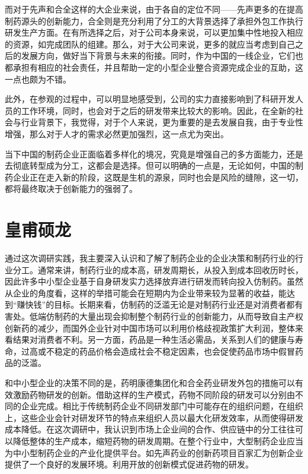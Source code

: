 而对于先声和合全这样的大企业来说，由于各自的定位不同——先声更多的在提高制药源头的创新能力，合全则是充分利用了分工的大背景选择了承担外包工作执行研发生产方面。在有所选择之后，对于公司本身来说，可以更加集中性地投入相应的资源，如完成团队的组建。那么，对于大公司来说，更多的就应当考虑到自己之后的发展方向，做好当下背景与未来的衔接。同时，作为中国的一线企业，它们也都承担有相应的社会责任，并且帮助一定的小型企业整合资源完成企业的互助，这一点也颇为不错。

此外，在参观的过程中，可以明显地感受到，公司的实力直接影响到了科研开发人员的工作环境，同时，也会对于之后的研发带来比较大的影响。因此，在全新的社会与行业背景下，我觉得，对于个人来说，更为重要的是去发展自我，由于专业性增强，那么对于人才的需求必然更加强烈，这一点尤为突出。

当下中国的制药企业正面临着多样化的境况，究竟是增强自己的多方面能力，还是去彻底转型成为分工，这都会是选择。但可以明确的一点是，无论如何，中国的制药企业正在走入新的阶段，这既是生机的源泉，同时也会是风险的缝隙，这一切，都将最终取决于创新能力的强弱了。


\section*{皇甫硕龙}

通过这次调研实践，我主要深入认识和了解了制药企业的企业决策和制药行业的行业分工。通常来讲，制药行业的成本高，研发周期长，从投入到成本回收历时长，因此许多中小型企业基于自身研发实力选择放弃进行研发而转向投入仿制药。虽然从企业的角度看，这样的举措可能会在短期内为企业带来较为显著的收益，能达到“赚快钱”的目标。长期来看，仿制药的泛滥无论是对制药行业还是对消费者都有害处。低端仿制药的大量出现会抑制整个制药行业的创新能力，从而导致自主产权创新药的减少，而国外企业针对中国市场可以利用价格歧视政策扩大利润，整体来看结果对消费者不利。另一方面，药品是一种生活必需品，关系到人们的健康与寿命，过高或不稳定的药品价格会造成社会不稳定因素，也会促使药品市场中假冒药品的泛滥。

和中小型企业的决策不同的是，药明康德集团化和合全药业研发外包的措施可以有效激励药物研发的创新。借助这样的生产模式，药物不同阶段的研发可以分别由不同的企业完成。相比于传统制药企业不同研发部门中可能存在的组织问题，在组织上，这些企业会针对研发环节的特点来组织人员以最大化研发效率，从而使得研发成本降低。在这次调研中，我认识到市场上企业间的合作、供应链中的分工往往可以降低整体的生产成本，缩短药物的研发周期。在整个行业中，大型制药企业应当为中小型制药企业的产业化提供平台。如先声药业的创新药项目百家汇为创新企业提供了一个良好的发展环境。利用开放的创新模式促进药物的研发。

